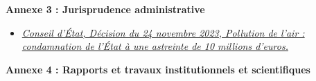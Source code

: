 \documentclass[12pt,a4paper]{article}
\begin{document}
\vspace{0.8cm}

\noindent\textbf{Annexe 3 : Jurisprudence administrative}
\vspace{0.3cm}
\begin{itemize}
    \item \textit{\href{https://www.conseil-etat.fr/actualites/pollution-de-l-air-le-conseil-d-etat-condamne-l-etat-a-payer-deux-astreintes-de-5-millions-d-euros}{Conseil d'État, Décision du 24 novembre 2023, Pollution de l’air : condamnation de l’État à une astreinte de 10 millions d’euros.}}
\end{itemize}

\vspace{0.8cm}

\noindent\textbf{Annexe 4 : Rapports et travaux institutionnels et scientifiques}
\vspace{0.3cm}
\end{document}
